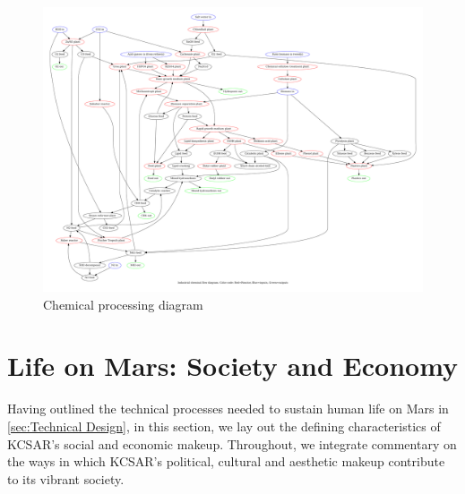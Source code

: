 \documentclass[fleqn,10pt]{Stylesheet} %
\begin{document}
\begin{figure}
    \centering
    \includegraphics[width=\linewidth]{figures/fig_chem.pdf}
    \caption{Chemical processing diagram}
    \label{fig:chem_diagram}
\end{figure}





\section{Life on Mars: Society and Economy}
Having outlined the technical processes needed to sustain human life on Mars in \ref{sec:Technical Design}, in this section, we lay out the defining characteristics of KCSAR's social and economic makeup. Throughout, we integrate commentary on the ways in which KCSAR's political, cultural and aesthetic makeup contribute to its vibrant society.
\end{document}
